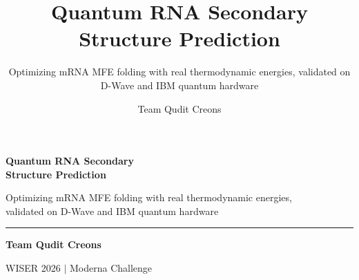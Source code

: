 \documentclass[aspectratio=169,10pt]{beamer}
\title{\textbf{Quantum RNA Secondary Structure Prediction}}
\subtitle{Optimizing mRNA MFE folding with real thermodynamic energies, validated on D-Wave and IBM quantum hardware}
\author{Team Qudit Creons}
\institute{WISER 2026 --- Moderna Challenge}
\date{}
\begin{document}
{
\begin{frame}[plain]
  \vspace{1.2cm}
  {\huge\textbf{Quantum RNA Secondary\\[2pt] Structure Prediction}\par}
  \vspace{0.5cm}
  {\color{ice}\large Optimizing mRNA MFE folding with real thermodynamic energies,\\ validated on D-Wave and IBM quantum hardware\par}
  \vspace{0.9cm}
  {\color{accent}\rule{3.5cm}{1.5pt}\par}
  \vspace{0.4cm}
  {\color{white}\Large\textbf{Team Qudit Creons}\par}
  {\color{muted}\large WISER 2026 \; $\vert$ \; Moderna Challenge\par}
\end{frame}
}
\end{document}
